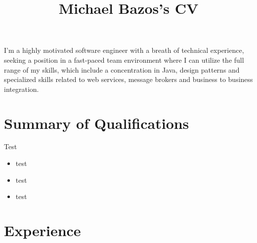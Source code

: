 \documentclass[a4paper,online]{adcv}
\title{Michael Bazos’s CV}
\begin{document}
I’m a highly motivated software engineer with a breath of technical experience, seeking a position in a fast-paced team environment where I can utilize the full range of my skills, which include a concentration in Java, design patterns and specialized skills related to web services, message brokers and business to business integration.

\section{Summary of Qualifications}

\begin{adcvtabletwo}
Test
  \begin{itemize}
    \item test
    \item test
    \item test
  \end{itemize}
\end{adcvtabletwo}

\section{Experience}
\end{document}
